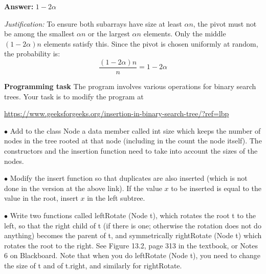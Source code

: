\documentclass[11pt]{article}
\begin{document}
\textbf{Answer:} $1 - 2\alpha$

\textit{Justification:} To ensure both subarrays have size at least $\alpha n$, the pivot must not be among the smallest $\alpha n$ or the largest $\alpha n$ elements. Only the middle $(1 - 2\alpha)n$ elements satisfy this. Since the pivot is chosen uniformly at random, the probability is:
\[
\frac{(1 - 2\alpha)n}{n} = 1 - 2\alpha
\]

\bigskip


\newpage



\textbf{Programming task} The program involves various operations for binary search trees. Your task is to modify the program  at


\url{https://www.geeksforgeeks.org/insertion-in-binary-search-tree/?ref=lbp}
\medskip

$\bullet$ Add to the class \textsf{Node}  a data member called \textsf{int size} which keeps the number of nodes in the tree rooted at that node (including in the count the node itself). The constructors and the insertion function need to take into account the sizes of the nodes.
\medskip

$\bullet$ Modify the \textsf{insert} function so that duplicates are also inserted (which is not done in the version at the above link). If the value $x$  to be inserted is equal to the value in the root, insert $x$ in the left subtree.
\medskip





$\bullet$  Write two functions called \textsf{leftRotate (Node t)}, which rotates the root t to the left, so that the right child of t (if there is one; otherwise the rotation does not do anything) becomes the parent of t, and symmetrically  \textsf{rightRotate (Node t) which rotates the root to the right}. See Figure 13.2, page 313 in the textbook, or Notes 6 on Blackboard. Note that when you do \textsf{leftRotate (Node t)}, you need to change the size of \textsf{t} and of \textsf{t.right}, and similarly for \textsf{rightRotate}.


\end{document}
